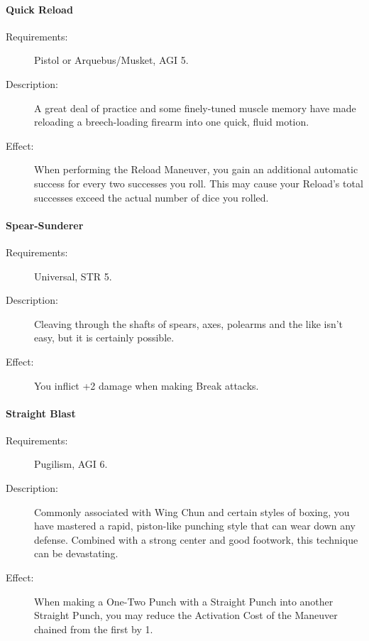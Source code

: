 \documentclass[oneside,11pt,english]{book}
\begin{document}
\paragraph{\label{talent:Quick Reload}Quick Reload}
\begin{description}
\item [Requirements:] Pistol or Arquebus/Musket, AGI 5. 
\item [Description:] A great deal of practice and some finely-tuned muscle memory have made reloading a breech-loading firearm into one quick, fluid motion. 
\item [Effect:] When performing the Reload Maneuver, you gain an additional automatic success for every two successes you roll. This may cause your Reload’s total successes exceed the actual number of dice you rolled. 
  
\end{description}
\paragraph{\label{talent:Spear-Sunderer}Spear-Sunderer}
\begin{description}
\item [Requirements:] Universal, STR 5. 
\item [Description:] Cleaving through the shafts of spears, axes, polearms and the like isn’t easy, but it is certainly possible.
\item [Effect:] You inflict +2 damage when making Break attacks. 
  
\end{description}
\paragraph{\label{talent:Straight Blast}Straight Blast}
\begin{description}
\item [Requirements:] Pugilism, AGI 6. 
\item [Description:] Commonly associated with Wing Chun and certain styles of boxing, you have mastered a rapid, piston-like punching style that can wear down any defense. Combined with a strong center and 
  good footwork, this technique can be devastating. 
\item [Effect:] When making a One-Two Punch with a Straight Punch into another Straight Punch, you may reduce the Activation Cost of the Maneuver chained from the first by 1. 
  
\end{description}
\end{document}
